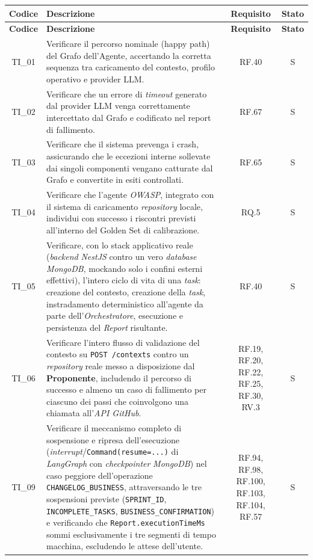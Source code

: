\documentclass[12pt, a4paper]{article}
\newlength{\LargColVal} %
\begin{document}
\renewcommand{\arraystretch}{1.3}
\begin{xltabular}{\textwidth}{|c|X|C{\LargColVal}|C{\LargColVal}|}
    \hline
    \textbf{Codice} & \textbf{Descrizione} & \textbf{Requisito} & \textbf{Stato} \\ \hline
    \endfirsthead

    \hline
    \textbf{Codice} & \textbf{Descrizione} & \textbf{Requisito} & \textbf{Stato} \\ \hline
    \endhead

    TI\_01 & Verificare il percorso nominale (happy path) del Grafo dell'Agente, accertando la corretta sequenza tra caricamento del contesto, profilo operativo e provider LLM. & RF.40 & S \\ \hline
    TI\_02 & Verificare che un errore di \textit{timeout} generato dal provider LLM venga correttamente intercettato dal Grafo e codificato nel report di fallimento. & RF.67 & S \\ \hline
    TI\_03 & Verificare che il sistema prevenga i crash, assicurando che le eccezioni interne sollevate dai singoli componenti vengano catturate dal Grafo e convertite in esiti controllati. & RF.65 & S \\ \hline
    TI\_04 & Verificare che l'agente \textit{OWASP}, integrato con il sistema di caricamento \textit{repository} locale, individui con successo i riscontri previsti all'interno del Golden Set di calibrazione. & RQ.5 & S \\ \hline
    TI\_05 & Verificare, con lo stack applicativo reale (\textit{backend} \textit{NestJS} contro un vero \textit{database} \textit{MongoDB}, mockando solo i confini esterni effettivi), l'intero ciclo di vita di una \textit{task}: creazione del contesto, creazione della \textit{task}, instradamento deterministico all'agente da parte dell'\textit{Orchestratore}, esecuzione e persistenza del \textit{Report} risultante. & RF.40 & S \\ \hline

    TI\_06 & Verificare l'intero flusso di validazione del contesto su \texttt{POST /contexts} contro un \textit{repository} reale messo a disposizione dal \textbf{Proponente}, includendo il percorso di successo e almeno un caso di fallimento per ciascuno dei passi che coinvolgono una chiamata all'\textit{API GitHub}. & RF.19, RF.20, RF.22, RF.25, RF.30, RV.3 & S \\ \hline



    TI\_09 & Verificare il meccanismo completo di sospensione e ripresa dell'esecuzione (\textit{interrupt}/\texttt{Command(resume=...)} di \textit{LangGraph} con \textit{checkpointer} \textit{MongoDB}) nel caso peggiore dell'operazione \texttt{CHANGELOG\_BUSINESS}, attraversando le tre sospensioni previste (\texttt{SPRINT\_ID}, \texttt{INCOMPLETE\_TASKS}, \texttt{BUSINESS\_CONFIRMATION}) e verificando che \texttt{Report.executionTimeMs} sommi esclusivamente i tre segmenti di tempo macchina, escludendo le attese dell'utente. & RF.94, RF.98, RF.100, RF.103, RF.104, RF.57 & S \\ \hline


\end{xltabular}
\end{document}
